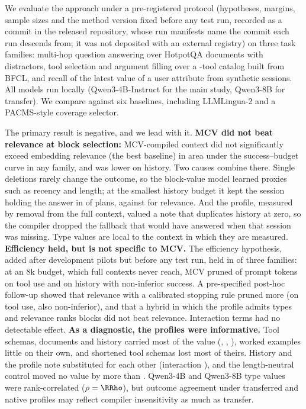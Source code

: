 We evaluate the approach under a pre-registered protocol (hypotheses, margins, sample sizes and the method version fixed
before any test run, recorded as a commit in the released repository, whose run manifests name the commit each run descends from; it was not
deposited with an external registry) on three task families: multi-hop question answering over HotpotQA documents with distractors,
tool selection and argument filling over a \RNumTools-tool catalog built from BFCL, and recall of the latest value of a
user attribute from \RNumSessions synthetic sessions. All models run locally (Qwen3-4B-Instruct for the main study,
Qwen3-8B for transfer). We compare against six baselines, including LLMLingua-2 and a PACMS-style coverage selector.

The primary result is negative, and we lead with it. \textbf{MCV did not beat relevance at block selection:}
MCV-compiled context did not significantly exceed embedding relevance (the best baseline) in area under the
success--budget curve in any family, and was \RHOneHistoryAbs{} lower on history. Two causes combine there. Single
deletions rarely change the outcome, so the block-value model learned proxies such as recency and length; at the smallest
history budget it kept the session holding the answer in \RRecallOurs of plans, against \RRecallRel for relevance. And the
profile, measured by removal from the full context, valued a note that duplicates history at zero, so the compiler dropped
the fallback that would have answered when that session was missing. Type values are local to the context in which they
are measured.
\textbf{Efficiency held, but is not specific to MCV.} The efficiency hypothesis, added after development pilots but before
any test run, held in \RHOnebPass of three families: at an 8k budget, which full contexts never reach, MCV pruned
\RTokCutTool of prompt tokens on tool use and \RTokCutHistory on history with non-inferior success. A pre-specified
post-hoc follow-up showed that relevance with a calibrated stopping rule pruned more (\RTokCutStopTool on tool use, also
non-inferior), and that a hybrid in which the profile admits types and relevance ranks blocks did not beat relevance.
Interaction terms had no detectable effect. \textbf{As a diagnostic, the profiles were informative.} Tool schemas,
documents and history carried most of the value (\RMcvToolToolSchema, \RMcvFactsFact, \RMcvHistoryHistoryTurn),
worked examples little on their own, and shortened tool schemas lost most of theirs. History and the profile note
substituted for each other (interaction \RIntHistoryHistoryTurnNote), and the length-neutral control moved no value by
more than \RPadDiffMax. Qwen3-4B and Qwen3-8B type values were rank-correlated ($\rho=\RRho$), but outcome agreement under
transferred and native profiles may reflect compiler insensitivity as much as transfer.

